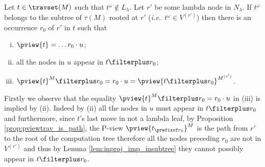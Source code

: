 \begin{lemma}
\label{lem:pview_trav_projection}
   Let $t \in \travset(M)$ such that $t^\omega \not\in L_\lambda$.
   Let $r'$ be some lambda node in $N_\lambda$.
        If $t^\omega$ belongs to the subtree of $\tau(M)$ rooted at $r'$ ({\it i.e.}\ $t^\omega \in V^{(r')}$) then there is an occurrence $r_0$ of $r'$ in $t$ such that
        \begin{enumerate}[(i)]
        \item $\pview{t} = \ldots r_0 \cdot u$;
        \item all the nodes in $u$ appear in $t\filterplus r_0$;
        \item $\pview{t}^M \filterplus r_0 = r_0\cdot u =  \pview{t\filterplus r_0}^{M^{(r')}}$.
        \end{enumerate}

\end{lemma}
\proof Firstly we observe that the equality $\pview{t}^M \filterplus
r_0 = r_0\cdot u$ in (iii) is implied by (ii). Indeed by (ii) all
the nodes in $u$ must appear in $t\filterplus r_0$ and furthermore,
since $t$'s last move in not a lambda leaf, by Proposition
\ref{prop:pviewtrav_is_path}, the P-view $\pview{t_{\prefixof
r_0}}^M$ is the path from $r'$ to the root of the computation tree
therefore all the nodes preceding $r_0$ are not in $V^{(r')}$ and
thus by Lemma \ref{lem:inproj_imp_insubtree} they cannot possibly
appear in $t \filterplus r_0$.

